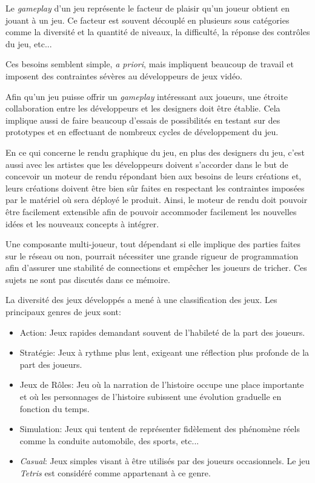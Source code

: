 \documentclass[12pt,oneside,letterpaper,francais]{book}
\begin{document}
Le \textit{gameplay} d'un jeu représente le facteur de plaisir qu'un
joueur obtient en jouant à un jeu. Ce facteur est souvent découplé en
plusieurs sous catégories comme la diversité et la quantité de
niveaux, la difficulté, la réponse des contrôles du jeu, etc...

Ces besoins semblent simple, \textit{a priori}, mais impliquent
beaucoup de travail et imposent des contraintes sévères au
développeurs de jeux vidéo.

Afin qu'un jeu puisse offrir un \textit{gameplay} intéressant aux
joueurs, une étroite collaboration entre les développeurs et les
designers doit être établie. Cela implique aussi de faire beaucoup
d'essais de possibilités en testant sur des prototypes et en
effectuant de nombreux cycles de développement du jeu.

En ce qui concerne le rendu graphique du jeu, en plus des designers du
jeu, c'est aussi avec les artistes que les développeurs doivent
s'accorder dans le but de concevoir un moteur de rendu répondant bien
aux besoins de leurs créations et, leurs créations doivent être bien
sûr faites en respectant les contraintes imposées par le matériel où
sera déployé le produit. Ainsi, le moteur de rendu doit pouvoir être
facilement extensible afin de pouvoir accommoder facilement les
nouvelles idées et les nouveaux concepts à intégrer.

Une composante multi-joueur, tout dépendant si elle implique des
parties faites sur le réseau ou non, pourrait nécessiter une grande
rigueur de programmation afin d'assurer une stabilité de connections et
empêcher les joueurs de tricher. Ces sujets ne sont pas discutés dans
ce mémoire.

La diversité des jeux développés a mené à une classification des
jeux. Les principaux genres de jeux sont:

\begin{itemize}
\item Action: Jeux rapides demandant souvent de l'habileté de la part
  des joueurs.
\item Stratégie: Jeux à rythme plus lent, exigeant une réflection plus
  profonde de la part des joueurs.
\item Jeux de Rôles: Jeu où la narration de l'histoire occupe une
  place importante et où les personnages de l'histoire subissent une
  évolution graduelle en fonction du temps.
\item Simulation: Jeux qui tentent de représenter fidèlement des
  phénomène réels comme la conduite automobile, des sports, etc...
\item \textit{Casual}: Jeux simples visant à être utilisés par des
  joueurs occasionnels. Le jeu \textit{Tetris} est considéré comme
  appartenant à ce genre.
\end{itemize}
\end{document}
